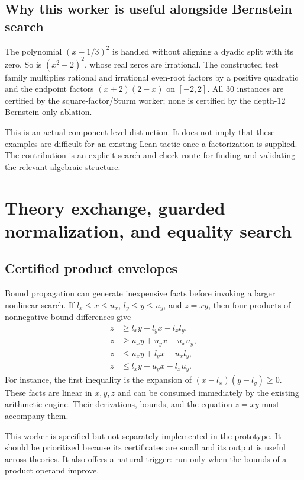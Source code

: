\documentclass[11pt,a4paper]{article}
\theoremstyle{definition}
\begin{document}
\subsection{Why this worker is useful alongside Bernstein search}

The polynomial $(x-1/3)^2$ is handled without aligning a dyadic split with its zero. So is $(x^2-2)^2$, whose real zeros are irrational. The constructed test family multiplies rational and irrational even-root factors by a positive quadratic and the endpoint factors $(x+2)(2-x)$ on $[-2,2]$. All 30 instances are certified by the square-factor/Sturm worker; none is certified by the depth-12 Bernstein-only ablation.

This is an actual component-level distinction. It does not imply that these examples are difficult for an existing Lean tactic once a factorization is supplied. The contribution is an explicit search-and-check route for finding and validating the relevant algebraic structure.

\section{Theory exchange, guarded normalization, and equality search}

\subsection{Certified product envelopes}

Bound propagation can generate inexpensive facts before invoking a larger nonlinear search. If $l_x\le x\le u_x$, $l_y\le y\le u_y$, and $z=xy$, then four products of nonnegative bound differences give
\begin{align*}
 z&\ge l_xy+l_yx-l_xl_y,\\
 z&\ge u_xy+u_yx-u_xu_y,\\
 z&\le u_xy+l_yx-u_xl_y,\\
 z&\le l_xy+u_yx-l_xu_y.
\end{align*}
For instance, the first inequality is the expansion of $(x-l_x)(y-l_y)\ge0$. These facts are linear in $x,y,z$ and can be consumed immediately by the existing arithmetic engine. Their derivations, bounds, and the equation $z=xy$ must accompany them.

This worker is specified but not separately implemented in the prototype. It should be prioritized because its certificates are small and its output is useful across theories. It also offers a natural trigger: run only when the bounds of a product operand improve.
\end{document}
